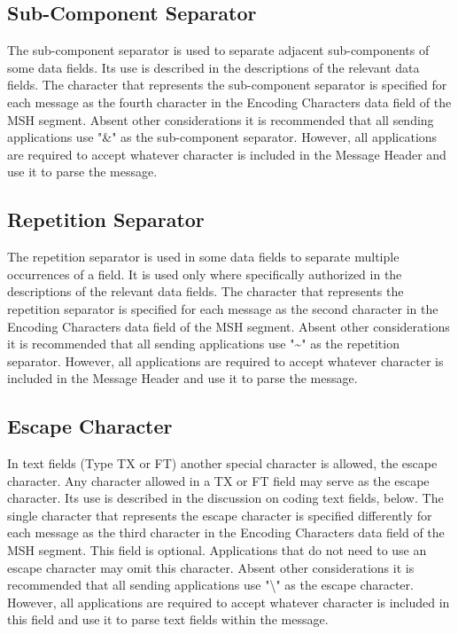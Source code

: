 \documentclass[a4paper,12pt]{article}
\begin{document}
\subsection*{Sub-Component Separator}
The sub-component separator is used to separate adjacent sub-components of some data fields. Its use is described in the descriptions of the relevant data fields. The character that represents the sub-component separator is specified for each message as the fourth character in the Encoding Characters data field of the MSH segment. Absent other considerations it is recommended that all sending applications use "\&" as the sub-component separator. However, all applications are required to accept whatever character is included in the Message Header and use it to parse the message.
\subsection*{Repetition Separator}
The repetition separator is used in some data fields to separate multiple occurrences of a field. It is used only where specifically authorized in the descriptions of the relevant data fields. The character that represents the repetition separator is specified for each message as the second character in the Encoding Characters data field of the MSH segment. Absent other considerations it is recommended that all sending applications use "\textasciitilde" as the repetition separator. However, all applications are required to accept whatever character is included in the Message Header and use it to parse the message.
\subsection*{Escape Character}
In text fields (Type TX or FT) another special character is allowed, the escape character. Any character allowed in a TX or FT field may serve as the escape character. Its use is described in the discussion on coding text fields, below. The single character that represents the escape character is specified differently for each message as the third character in the Encoding Characters data field of the MSH segment. This field is optional. Applications that do not need to use an escape character may omit this character. Absent other considerations it is recommended that all sending applications use "\textbackslash" as the escape character. However, all applications are required to accept whatever character is included in this field and use it to parse text fields within the message.
\end{document}
